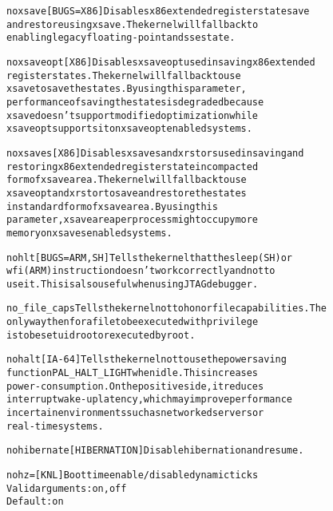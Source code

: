 \documentclass[a4paper,8pt,english]{sphinxmanual}
\begin{document}
\begin{alltt}
        noxsave         {[}BUGS=X86{]} Disables x86 extended register state save
                        and restore using xsave. The kernel will fallback to
                        enabling legacy floating-point and sse state.

        noxsaveopt      {[}X86{]} Disables xsaveopt used in saving x86 extended
                        register states. The kernel will fall back to use
                        xsave to save the states. By using this parameter,
                        performance of saving the states is degraded because
                        xsave doesn't support modified optimization while
                        xsaveopt supports it on xsaveopt enabled systems.

        noxsaves        {[}X86{]} Disables xsaves and xrstors used in saving and
                        restoring x86 extended register state in compacted
                        form of xsave area. The kernel will fall back to use
                        xsaveopt and xrstor to save and restore the states
                        in standard form of xsave area. By using this
                        parameter, xsave area per process might occupy more
                        memory on xsaves enabled systems.

        nohlt           {[}BUGS=ARM,SH{]} Tells the kernel that the sleep(SH) or
                        wfi(ARM) instruction doesn't work correctly and not to
                        use it. This is also useful when using JTAG debugger.

        no\_file\_caps    Tells the kernel not to honor file capabilities.  The
                        only way then for a file to be executed with privilege
                        is to be setuid root or executed by root.

        nohalt          {[}IA-64{]} Tells the kernel not to use the power saving
                        function PAL\_HALT\_LIGHT when idle. This increases
                        power-consumption. On the positive side, it reduces
                        interrupt wake-up latency, which may improve performance
                        in certain environments such as networked servers or
                        real-time systems.

        nohibernate     {[}HIBERNATION{]} Disable hibernation and resume.

        nohz=           {[}KNL{]} Boottime enable/disable dynamic ticks
                        Valid arguments: on, off
                        Default: on


\end{alltt}
\end{document}
